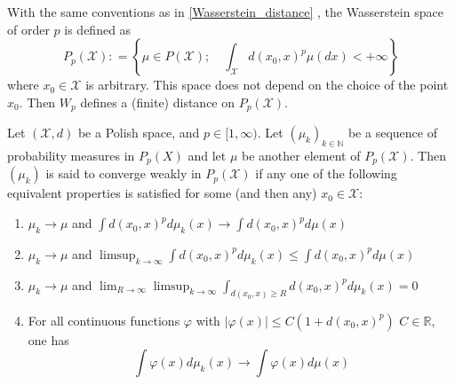 \begin{defn}
	\label{Wasserstein_space}
	With the same conventions as in \cref{Wasserstein_distance} , the Wasserstein space of order \( p \) is defined as
	\[
		P _ { p } ( \mathcal { X } ): = \left\{ \mu \in P ( \mathcal { X } ) ; \quad \int _ { \mathcal { X } } d \left( x _ { 0 } , x \right) ^ { p } \mu ( d x ) < + \infty \right\}
	\]
	where \( x _ { 0 } \in \mathcal { X } \) is arbitrary. This space does not depend on the choice of the point \( x _ { 0 } \). Then \( W _ { p } \) defines a (finite) distance on \( P _ { p } ( \mathcal { X } ) \).
\end{defn}

\begin{defn}
	Let \( ( \mathcal { X } , d ) \) be a Polish space, and \( p \in [ 1 , \infty ) \). Let \( \left( \mu _ { k } \right) _ { k \in \mathbb { N } } \) be a sequence of probability measures in \( P _ { p } ( X ) \) and let \( \mu \) be another element of \( P _ { p } ( \mathcal { X } ) . \) Then \( \left( \mu _ { k } \right) \) is said to converge weakly in \( P _ { p } ( \mathcal { X } ) \) if any one of the following equivalent properties is satisfied for some (and then any) \( x _ { 0 } \in \mathcal { X }: \)
	\begin{enumerate}
		\item \( \mu _ { k } \longrightarrow \mu \) and \( \int d \left( x _ { 0 } , x \right) ^ { p } d \mu _ { k } ( x ) \longrightarrow \int d \left( x _ { 0 } , x \right) ^ { p } d \mu ( x ) \)
		\item \( \mu _ { k } \longrightarrow \mu \) and \( \limsup _ { k \rightarrow \infty } \int d \left( x _ { 0 } , x \right) ^ { p } d \mu _ { k } ( x ) \leq \int d \left( x _ { 0 } , x \right) ^ { p } d \mu ( x ) \)
		\item \( \mu _ { k } \longrightarrow \mu \) and \( \lim _ { R \rightarrow \infty } \limsup _ { k \rightarrow \infty } \int _ { d \left( x _ { 0 } , x \right) \geq R } d \left( x _ { 0 } , x \right) ^ { p } d \mu _ { k } ( x ) = 0 \)
		\item For all continuous functions \( \varphi \) with \( | \varphi ( x ) | \leq C \left( 1 + d \left( x _ { 0 } , x \right) ^ { p } \right) \)
		      \( C \in \mathbb { R } \), one has
		      \[ \int \varphi ( x ) d \mu _ { k } ( x ) \longrightarrow \int \varphi ( x ) d \mu ( x ) \]
	\end{enumerate}
\end{defn}

